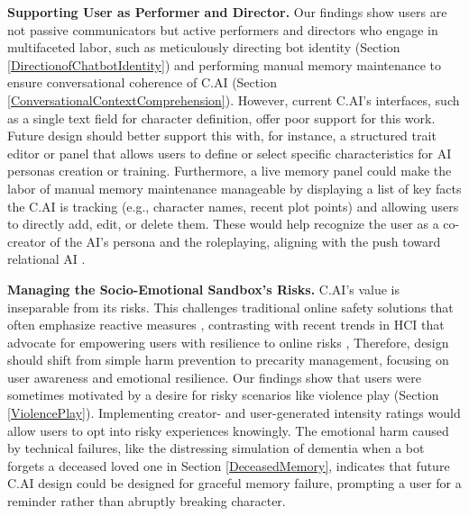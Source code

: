 \documentclass[sigconf, nonacm]{acmart}
\newcommand{\implications}[1]{{\color{black}{#1}}}
\begin{document}
\textbf{Supporting User as Performer and Director.} Our findings show users are not passive communicators but active performers and directors who engage in multifaceted labor, such as meticulously directing bot identity (Section \ref{DirectionofChatbotIdentity}) and performing manual memory maintenance to ensure conversational coherence of C.AI (Section \ref{ConversationalContextComprehension}). However, current C.AI's interfaces, such as a single text field for character definition, offer poor support for this work. Future design should better support this with, for instance, a structured trait editor or panel that allows users to define or select specific characteristics for AI personas creation or training. Furthermore, a live memory panel could make the labor of manual memory maintenance manageable by displaying a list of key facts the C.AI is tracking (e.g., character names, recent plot points) and allowing users to directly add, edit, or delete them. These would help recognize the user as a co-creator of the AI's persona and the roleplaying, aligning with the push toward relational AI \cite{claggett2025relational}.

\textbf{Managing the Socio-Emotional Sandbox's Risks.} 
\implications{Unlike commercial game platforms where content is often fixed, professionally produced, and age-rated, C.AI's chatbot personas are community-created, dynamically shaped by user prompts, and can be vulnerable to manipulation. As chatbot identities and behaviors can shift unpredictably, traditional age- or genre-based rating systems are insufficient.} C.AI's value is inseparable from its risks. This challenges traditional online safety solutions that often emphasize reactive measures \cite{Wisniewski2017ParentalSafety}, contrasting with recent trends in HCI that advocate for empowering users with resilience to online risks \cite{Badillo-Urquiola2020BeyondDesign, Agha2023StrikePrevention}, \implications{which further highlights the need for interaction-aware safeguards tailored to companion AI chatbots like C.AI.} Therefore, design should shift from simple harm prevention to precarity management, focusing on user awareness and emotional resilience. Our findings show that users were sometimes motivated by a desire for risky scenarios like violence play (Section \ref{ViolencePlay}). Implementing creator- and user-generated intensity ratings would allow users to opt into risky experiences knowingly. The emotional harm caused by technical failures, like the distressing simulation of dementia when a bot forgets a deceased loved one in Section \ref{DeceasedMemory}, indicates that future C.AI design could be designed for graceful memory failure, prompting a user for a reminder rather than abruptly breaking character.
 
\end{document}
